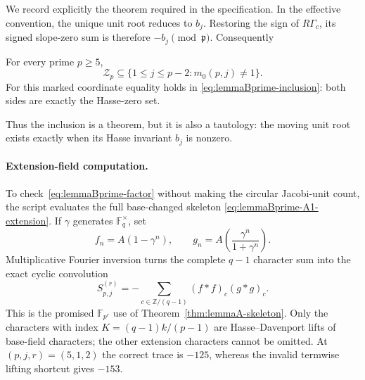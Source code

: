 We record explicitly the theorem required in the specification.  In the
effective convention, the unique unit root reduces to $b_j$.  Restoring
the sign of $R\Gamma_c$, its signed slope-zero sum is therefore
$-b_j\pmod{\mathfrak p}$.  Consequently
\begin{theorem}
\label{thm:lemmaBprime-inclusion}
For every prime $p\geq5$,
\begin{equation}
 \mathcal Z_p\subseteq
 \{1\leq j\leq p-2:m_0(p,j)\ne1\}.
 \label{eq:lemmaBprime-inclusion}
\end{equation}
For this marked coordinate equality holds in
\eqref{eq:lemmaBprime-inclusion}: both sides are exactly the Hasse-zero set.
\end{theorem}

Thus the inclusion is a theorem, but it is also a tautology: the moving
unit root exists exactly when its Hasse invariant $b_j$ is nonzero.

\paragraph{Extension-field computation.}
To check~\eqref{eq:lemmaBprime-factor} without making the circular
Jacobi-unit count, the script evaluates the full base-changed skeleton
\eqref{eq:lemmaBprime-A1-extension}.  If $\gamma$ generates
$\mathbb F_q^\times$, set
\[
 f_n=A(1-\gamma^n),\qquad
 g_n=A\left(\frac{\gamma^n}{1+\gamma^n}\right).
\]
Multiplicative Fourier inversion turns the complete $q-1$ character sum
into the exact cyclic convolution
\begin{equation}
 S_{p,j}^{(r)}=-\sum_{c\in\mathbb Z/(q-1)}(f*f)_c(g*g)_c.
 \label{eq:lemmaBprime-cyclic-engine}
\end{equation}
This is the promised $\mathbb F_{p^r}$ use of
Theorem~\ref{thm:lemmaA-skeleton}.  Only the characters with index
$K=(q-1)k/(p-1)$ are Hasse--Davenport lifts of base-field characters; the
other extension characters cannot be omitted.  At $(p,j,r)=(5,1,2)$ the
correct trace is $-125$, whereas the invalid termwise lifting shortcut
gives $-153$.

